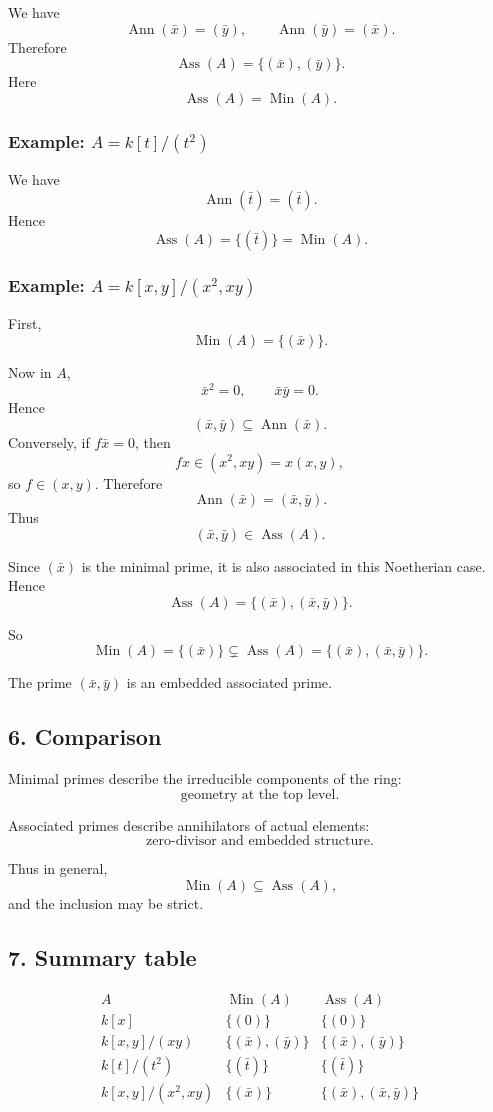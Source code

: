 \documentclass[12pt,a4paper,oneside]{report}
\DeclareMathOperator{\Ass}{Ass}
\DeclareMathOperator{\Ann}{Ann}
\DeclareMathOperator{\Min}{Min}
\theoremstyle{notespace}
\begin{document}
We have
\[
\Ann(\bar x)=(\bar y),\qquad \Ann(\bar y)=(\bar x).
\]
Therefore
\[
\Ass(A)=\{(\bar x),(\bar y)\}.
\]
Here
\[
\Ass(A)=\Min(A).
\]

\subsubsection{Example: \(A=k[t]/(t^2)\)}

We have
\[
\Ann(\bar t)=(\bar t).
\]
Hence
\[
\Ass(A)=\{(\bar t)\}=\Min(A).
\]

\subsubsection{Example: \(A=k[x,y]/(x^2,xy)\)}

First,
\[
\Min(A)=\{(\bar x)\}.
\]

Now in \(A\),
\[
\bar x^2=0,\qquad \bar x\bar y=0.
\]
Hence
\[
(\bar x,\bar y)\subseteq \Ann(\bar x).
\]
Conversely, if \(f\bar x=0\), then
\[
fx\in(x^2,xy)=x(x,y),
\]
so \(f\in(x,y)\). Therefore
\[
\Ann(\bar x)=(\bar x,\bar y).
\]
Thus
\[
(\bar x,\bar y)\in\Ass(A).
\]

Since \((\bar x)\) is the minimal prime, it is also associated in this Noetherian case. Hence
\[
\Ass(A)=\{(\bar x),(\bar x,\bar y)\}.
\]

So
\[
\Min(A)=\{(\bar x)\}
\subsetneq
\Ass(A)=\{(\bar x),(\bar x,\bar y)\}.
\]

The prime \((\bar x,\bar y)\) is an embedded associated prime.

\subsection{6. Comparison}

Minimal primes describe the irreducible components of the ring:
\[
\text{geometry at the top level.}
\]

Associated primes describe annihilators of actual elements:
\[
\text{zero-divisor and embedded structure.}
\]

Thus in general,
\[
\Min(A)\subseteq \Ass(A),
\]
and the inclusion may be strict.

\subsection{7. Summary table}

\[
\begin{array}{c|c|c}
	A & \Min(A) & \Ass(A)\\
	\hline
	k[x] & \{(0)\} & \{(0)\}\\[4pt]
	k[x,y]/(xy) & \{(\bar x),(\bar y)\} & \{(\bar x),(\bar y)\}\\[4pt]
	k[t]/(t^2) & \{(\bar t)\} & \{(\bar t)\}\\[4pt]
	k[x,y]/(x^2,xy) & \{(\bar x)\} & \{(\bar x),(\bar x,\bar y)\}
\end{array}
\]
\end{document}
